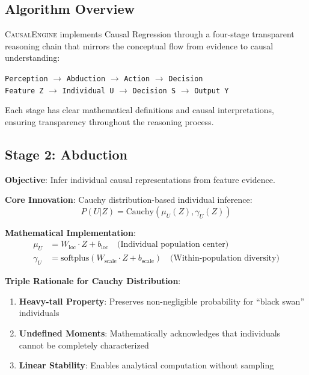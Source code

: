 \documentclass[letterpaper]{article} %
\newcommand{\causalengine}{\textsc{CausalEngine}}
\newcommand{\cauchy}{\text{Cauchy}}
\begin{document}
\subsection{Algorithm Overview}

\causalengine{} implements Causal Regression through a four-stage transparent reasoning chain that mirrors the conceptual flow from evidence to causal understanding:

\begin{center}
\texttt{Perception} $\rightarrow$ \texttt{Abduction} $\rightarrow$ \texttt{Action} $\rightarrow$ \texttt{Decision}\\
\texttt{Feature Z} $\rightarrow$ \texttt{Individual U} $\rightarrow$ \texttt{Decision S} $\rightarrow$ \texttt{Output Y}
\end{center}

Each stage has clear mathematical definitions and causal interpretations, ensuring transparency throughout the reasoning process.

\subsection{Stage 2: Abduction}

\textbf{Objective}: Infer individual causal representations from feature evidence.

\textbf{Core Innovation}: Cauchy distribution-based individual inference:
\begin{equation}
P(U|Z) = \cauchy(\mu_U(Z), \gamma_U(Z))
\end{equation}

\textbf{Mathematical Implementation}:
\begin{align}
\mu_U &= W_{\text{loc}} \cdot Z + b_{\text{loc}} \quad \text{(Individual population center)} \\
\gamma_U &= \text{softplus}(W_{\text{scale}} \cdot Z + b_{\text{scale}}) \quad \text{(Within-population diversity)}
\end{align}

\textbf{Triple Rationale for Cauchy Distribution}:
\begin{enumerate}
\item \textbf{Heavy-tail Property}: Preserves non-negligible probability for ``black swan'' individuals
\item \textbf{Undefined Moments}: Mathematically acknowledges that individuals cannot be completely characterized  
\item \textbf{Linear Stability}: Enables analytical computation without sampling
\end{enumerate}
\end{document}
